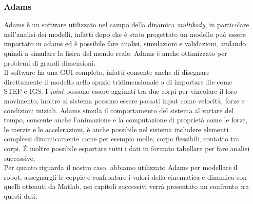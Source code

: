 \subsubsection{Adams}
Adams è un software utilizzato nel campo della dinamica \textit{multibody}, in particolare nell'analisi dei modelli, infatti dopo che è stato progettato un modello può essere importato in adams ed è possibile fare analisi, simulazioni e validazioni, andando quindi a simulare la fisica del mondo reale. Adams è anche ottimizzato per problemi di grandi dimensioni.
\\Il software ha una GUI completa, infatti consente anche di disegnare direttamente il modello nello spazio tridimensionale o di importare file come STEP e IGS. I \textit{joint} possono essere aggiunti tra due corpi per vincolare il loro movimento, inoltre al sistema possono essere passati input come velocità, forze e condizioni iniziali. Adams simula il comportamento del sistema al variare del tempo, consente anche l'animazione e la computazione di proprietà come le forze, le inerzie e le accelerazioni, è anche possibile nel sistema includere elementi complessi dinamicamente come per esempio molle, corpo flessibili, contatto tra corpi.
É inoltre possibile esportare tutti i dati in formato tabellare per fare analisi successive. 
\\Per quanto riguarda il nostro caso, abbiamo utilizzato Adams per modellare il robot, assegnargli le coppie e confrontare i valori della cinematica e dinamica con quelli ottenuti da Matlab, nei capitoli successivi verrà presentato un confronto tra questi dati.